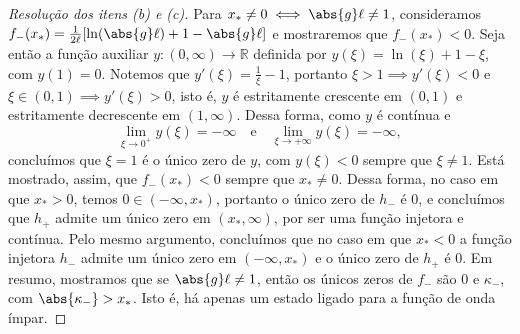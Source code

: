 \begin{proof}[Resolução dos itens (b) e (c)]
    Para \(x_* \neq 0\iff \abs{g} \ell \neq 1\), consideramos \(f_-(x_*) = \frac1{2\ell}[\ln(\abs{g}\ell) + 1 - \abs{g} \ell]\) e mostraremos que \(f_-(x_*) < 0\). Seja então a função auxiliar \(y : (0, \infty) \to \mathbb{R}\) definida por \(y(\xi) = \ln(\xi) + 1 - \xi\), com \(y(1) = 0\). Notemos que \(y'(\xi) = \frac{1}{\xi} - 1\), portanto \(\xi > 1 \implies y'(\xi) < 0\) e \(\xi \in (0,1) \implies y'(\xi) > 0\), isto é, \(y\) é estritamente crescente em \((0,1)\) e estritamente decrescente em \((1, \infty)\). Dessa forma, como \(y\) é contínua e
    \begin{equation*}
        \lim_{\xi \to 0^+}{y(\xi)} = -\infty\quad\text{e}\quad \lim_{\xi \to +\infty}{y(\xi)} = -\infty,
    \end{equation*}
    concluímos que \(\xi = 1\) é o único zero de \(y\), com \(y(\xi) < 0\) sempre que \(\xi \neq 1\). Está mostrado, assim, que \(f_-(x_*) < 0\) sempre que \(x_* \neq 0\). Dessa forma, no caso em que \(x_* > 0\), temos \(0 \in (-\infty, x_*)\), portanto o único zero de \(h_-\) é 0, e concluímos que \(h_+\) admite um único zero em \((x_*, \infty)\), por ser uma função injetora e contínua. Pelo mesmo argumento, concluímos que no caso em que \(x_* < 0\) a função injetora \(h_-\) admite um único zero em \((-\infty, x_*)\) e o único zero de \(h_+\) é 0. Em resumo, mostramos que se \(\abs{g}\ell \neq 1\), então os únicos zeros de \(f_-\) são \(0\) e \(\kappa_-\), com \(\abs{\kappa_-} > x_*\). Isto é, há apenas um estado ligado para a função de onda ímpar.
\end{proof}

